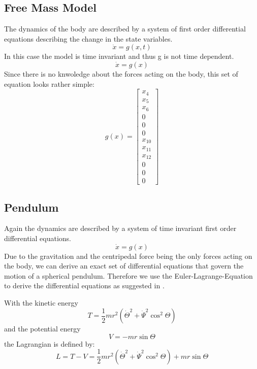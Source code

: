 \subsection*{Free Mass Model}
The dynamics of the body are described by a system of first order differential equations describing the change in the state variables.
\begin{equation} \dot{x}=g(x,t)  \end{equation}
In this case the model is time invariant and thus g is not time dependent. 
\begin{equation} \dot{x}=g(x)  \end{equation}
Since there is no knwoledge about the forces acting on the body, this set of equation looks rather simple: 
\begin{equation} g(x)=\begin{bmatrix}  x_{4} \\  x_{5} \\ x_{6} \\ 0 \\ 0 \\ 0 \\ x_{10} \\ x_{11} \\ x_{12} \\ 0 \\ 0 \\0 \end{bmatrix} \end{equation}

\subsection*{Pendulum}
Again the dynamics are described by a system of time invariant first order differential equations. 
\begin{equation} \dot{x}=g(x)  \end{equation}
Due to the gravitation and the centripedal force being the only forces acting on the body, we can derive an exact set of differential equations that govern the motion of a spherical pendulum. Therefore we use the Euler-Lagrange-Equation to derive the differential equations as suggested in \cite[156ff]{debnath2005}.

With the kinetic energy
\begin{equation} T=\frac{1}{2}mr^2(\dot{\Theta}^2+\dot{\Psi}^2\cos^2{\Theta})  \end{equation}
and the potential energy
\begin{equation} V=-mr\sin{\Theta}  \end{equation}
the Lagrangian is defined by:
\begin{equation} L=T-V = \frac{1}{2}mr^2(\dot{\Theta}^2+\dot{\Psi}^2\cos^2{\Theta})+mr\sin{\Theta}\end{equation}

